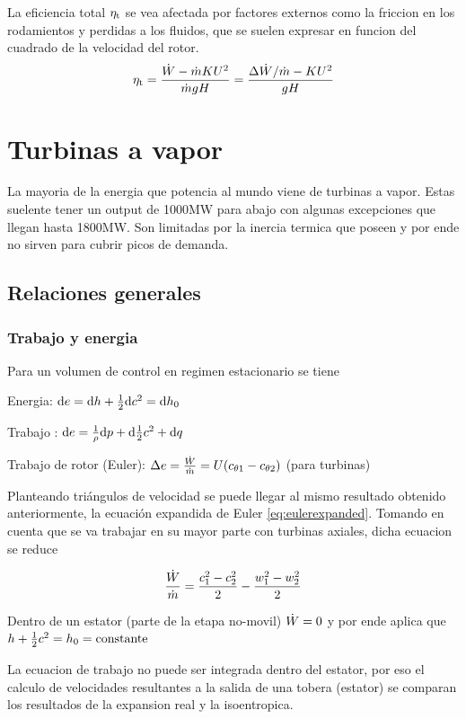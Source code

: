 \documentclass{article}
\begin{document}
La eficiencia total ${\eta_{\mathrm{t}}}$ se vea afectada por factores externos como la friccion en los rodamientos y perdidas a los fluidos, que se suelen expresar en funcion del cuadrado de la velocidad del rotor.
\[
{\eta_{\mathrm{t}}} = \frac{\dot{W}-\dot{m}KU^2}{\dot{m}gH} = \frac{\Delta \dot{W}/\dot{m} - KU^2}{gH}
\]

\section{Turbinas a vapor}

La mayoria de la energia que potencia al mundo viene de turbinas a vapor. Estas suelente tener un output de 1000MW para abajo con algunas excepciones que llegan hasta 1800MW. Son limitadas por la inercia termica que poseen y por ende no sirven para cubrir picos de demanda. 

\subsection{Relaciones generales}

\subsubsection{Trabajo y energia}
Para un volumen de control en regimen estacionario se tiene

Energia: $\textrm{d} e = \textrm{d} h +\frac{1}{2} \textrm{d} c^2 = \textrm{d} h_0$

Trabajo : $\textrm{d} e = \frac{1}{\rho} \textrm{d} p + \textrm{d} \frac{1}{2} c^2 + \textrm{d} q$

Trabajo de rotor (Euler): $\Delta e = \frac{\dot{W}}{\dot{m}} = U(c_{\theta 1}-c_{\theta 2})$ (para turbinas)

Planteando triángulos de velocidad se puede llegar al mismo resultado obtenido anteriormente, la ecuación expandida de Euler \eqref{eq:eulerexpanded}. Tomando en cuenta que se va trabajar en su mayor parte con turbinas axiales, dicha ecuacion se reduce

\begin{equation} \label{eq:eulerexpandidaAxial}
    \frac{\dot{W}}{\dot{m}} = \frac{c_1^2-c_2^2}{2} - \frac{w_1^2-w_2^2}{2}
\end{equation}

Dentro de un estator (parte de la etapa no-movil) $\dot{W}=0$ y por ende aplica que $h+\frac{1}{2} c^2 = h_0 = \textrm{constante}$

La ecuacion de trabajo no puede ser integrada dentro del estator, por eso el calculo de velocidades resultantes a la salida de una tobera (estator) se comparan los resultados de la expansion real y la isoentropica. 
\end{document}
